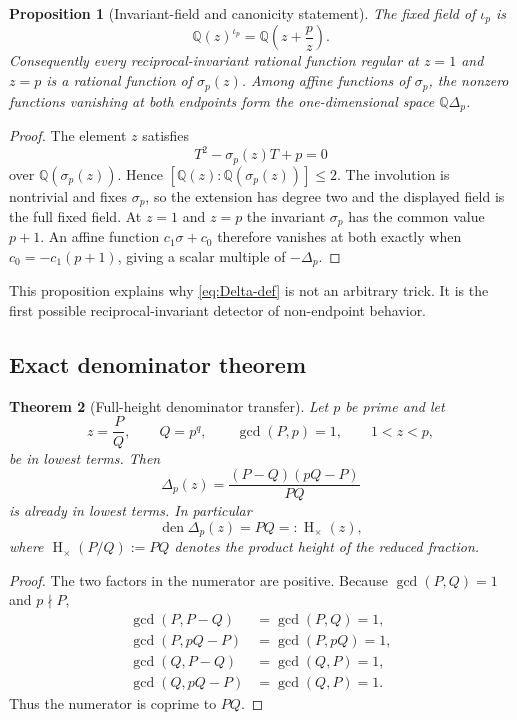 \documentclass[11pt]{article}
\newtheorem{theorem}{Theorem}[section]
\newtheorem{proposition}[theorem]{Proposition}
\theoremstyle{definition}
\theoremstyle{remark}
\newcommand{\Q}{\mathbb{Q}}
\newcommand{\den}{\operatorname{den}}
\newcommand{\Htimes}{\operatorname{H}_{\!\times}}
\begin{document}
\begin{proposition}[Invariant-field and canonicity statement]\label{prop:invariant-field}
The fixed field of $\iota_p$ is
\[
 \Q(z)^{\iota_p}=\Q\!\left(z+\frac pz\right).
\]
Consequently every reciprocal-invariant rational function regular at $z=1$ and $z=p$ is a rational function of $\sigma_p(z)$.  Among affine functions of $\sigma_p$, the nonzero functions vanishing at both endpoints form the one-dimensional space $\Q\Delta_p$.
\end{proposition}

\begin{proof}
The element $z$ satisfies
\[
 T^2-\sigma_p(z)T+p=0
\]
over $\Q(\sigma_p(z))$.  Hence $[\Q(z):\Q(\sigma_p(z))]\le2$.  The involution is nontrivial and fixes $\sigma_p$, so the extension has degree two and the displayed field is the full fixed field.  At $z=1$ and $z=p$ the invariant $\sigma_p$ has the common value $p+1$.  An affine function $c_1\sigma+c_0$ therefore vanishes at both exactly when $c_0=-c_1(p+1)$, giving a scalar multiple of $-\Delta_p$.
\end{proof}

This proposition explains why \eqref{eq:Delta-def} is not an arbitrary trick.  It is the first possible reciprocal-invariant detector of non-endpoint behavior.

\subsection{Exact denominator theorem}

\begin{theorem}[Full-height denominator transfer]\label{thm:full-height}
Let $p$ be prime and let
\[
 z=\frac{P}{Q},\qquad Q=p^q,\qquad \gcd(P,p)=1,
 \qquad 1<z<p,
\]
be in lowest terms.  Then
\begin{equation}\label{eq:Delta-PQ}
 \Delta_p(z)=\frac{(P-Q)(pQ-P)}{PQ}
\end{equation}
 is already in lowest terms.  In particular
\begin{equation}\label{eq:den-Delta}
 \den\Delta_p(z)=PQ=:\Htimes(z),
\end{equation}
where $\Htimes(P/Q):=PQ$ denotes the product height of the reduced fraction.
\end{theorem}

\begin{proof}
The two factors in the numerator are positive.  Because $\gcd(P,Q)=1$ and $p\nmid P$,
\begin{align*}
 \gcd(P,P-Q)&=\gcd(P,Q)=1,\\
 \gcd(P,pQ-P)&=\gcd(P,pQ)=1,\\
 \gcd(Q,P-Q)&=\gcd(Q,P)=1,\\
 \gcd(Q,pQ-P)&=\gcd(Q,P)=1.
\end{align*}
Thus the numerator is coprime to $PQ$.
\end{proof}
\end{document}

